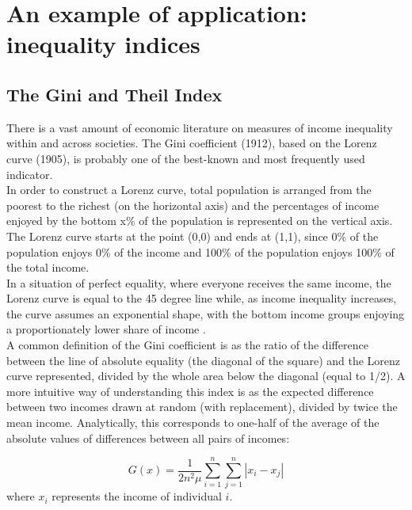 






\chapter{An example of application: inequality indices}

\section{The Gini and Theil Index}

There is a vast amount of economic literature on
measures of income inequality within and across societies.  The Gini coefficient (1912), based on the Lorenz curve (1905), is probably one of the best-known and most frequently used indicator.\\


In order to construct a Lorenz curve, total population
is arranged from the poorest to the richest (on the horizontal
axis) and the percentages of income enjoyed by
the bottom x\% of the population is represented on the
vertical axis. The Lorenz curve starts at the point (0,0)
and ends at (1,1), since 0\% of the population enjoys
0\% of the income and 100\% of the population enjoys 100\% of the total income.\\
In a situation of perfect equality, where
everyone receives the same income, the Lorenz curve is equal to the 45 degree line while, as income inequality increases, the curve assumes an exponential shape, with the bottom income groups enjoying a proportionately lower share of income \citep{Sen1973}.\\




A common definition of the Gini coefficient is
as the ratio of the difference between the line of absolute
equality (the diagonal of the square) and the
Lorenz curve represented, divided by the whole area
below the diagonal (equal to 1/2). A more intuitive
way of understanding this index is as the expected difference
between two incomes drawn at random (with
replacement), divided by twice the mean income. Analytically,
this corresponds to one-half of the average
of the absolute values of differences between all pairs
of incomes:


\begin{equation}
    G(x) = \frac{1}{2n^2 \mu} \sum_{i=1}^{n}\sum_{j=1}^{n} | x_i - x_j | 
\end{equation}
where $x_i$ represents the income of individual $i$.\\

